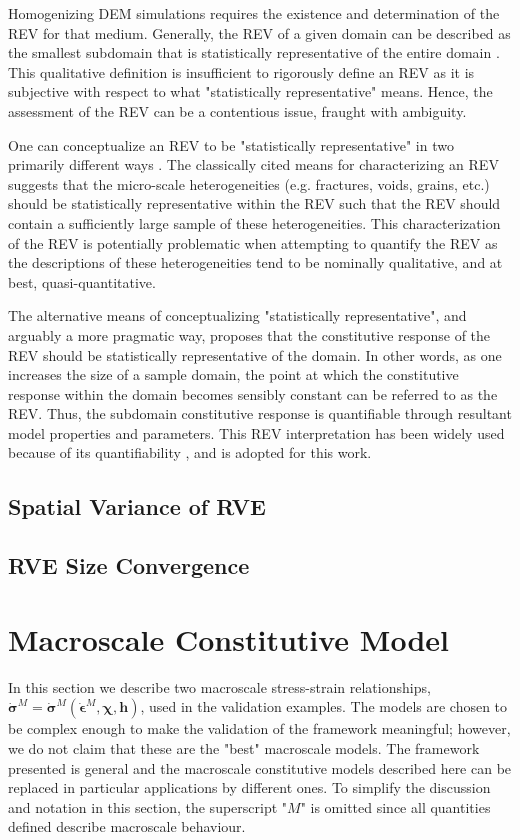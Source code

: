 Homogenizing DEM simulations requires the existence and determination of the REV for that medium. Generally, the REV of a given domain can be described as the smallest subdomain that is statistically representative of the entire domain \citep{Kanit_2003, Gitman_2007}. This qualitative definition is insufficient to rigorously define an REV as it is subjective with respect to what "statistically representative" means. Hence, the assessment of the REV can be a contentious issue, fraught with ambiguity.

One can conceptualize an REV to be "statistically representative" in two primarily different ways \citep{Drugan_1996}. The classically cited means for characterizing an REV suggests that the micro-scale heterogeneities (e.g. fractures, voids, grains, etc.) should be statistically representative within the REV such that the REV should contain a sufficiently large sample of these heterogeneities. This characterization of the REV is potentially problematic when attempting to quantify the REV as the descriptions of these heterogeneities tend to be nominally qualitative, and at best, quasi-quantitative.

The alternative means of conceptualizing "statistically representative", and arguably a more pragmatic way, proposes that the constitutive response of the REV should be statistically representative of the domain. In other words, as one increases the size of a sample domain, the point at which the constitutive response within the domain becomes sensibly constant can be referred to as the REV. Thus, the subdomain constitutive response is quantifiable through resultant model properties and parameters. This REV interpretation has been widely used because of its quantifiability \citep{Kanit_2003, Gitman_2005, Gusev_1997, M_ller_2010}, and is adopted for this work.

\subsection{Spatial Variance of RVE}
\subsection{RVE Size Convergence}

\section{Macroscale Constitutive Model}

In this section we describe two macroscale stress-strain relationships, $\dot{\boldsymbol{\sigma}}^M=\dot{\boldsymbol{\sigma}}^M\left(\dot{\boldsymbol{\epsilon}}^M, \boldsymbol{\chi},\mathbf{h}\right)$, used in the validation examples. The models are chosen to be complex enough to make the validation of the framework meaningful; however, we do not claim that these are the "best" macroscale models. The framework presented is general and the macroscale constitutive models described here can be replaced in particular applications by different ones. To simplify the discussion and notation in this section, the superscript "$M$" is omitted since all quantities defined describe macroscale behaviour.

